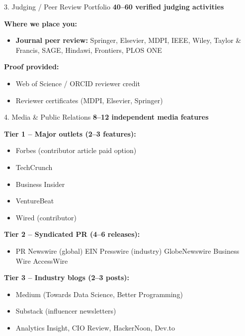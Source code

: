 \documentclass[aspectratio=169, 10pt]{beamer}
\begin{document}
	\begin{frame}{3. Judging / Peer Review Portfolio}
		\faGavel \hspace{0.2cm} \textbf{40–60 verified judging activities}
		
		\textbf{Where we place you:}
		\begin{itemize}
			\item \textbf{Journal peer review:} Springer, Elsevier, MDPI, IEEE, Wiley, Taylor \& Francis, SAGE, Hindawi, Frontiers, PLOS ONE
		\end{itemize}
		
		\textbf{Proof provided:}
		\begin{itemize}
			\item Web of Science / ORCID reviewer credit
			\item Reviewer certificates (MDPI, Elsevier, Springer)
		\end{itemize}
	\end{frame}
	
	\begin{frame}{4. Media \& Public Relations}
		\faNewspaper \hspace{0.2cm} \textbf{8–12 independent media features}
		
		\textbf{Tier 1 – Major outlets (2–3 features):}
		\begin{itemize}
			\item Forbes (contributor article paid option)
			\item TechCrunch
			\item Business Insider
			\item VentureBeat
			\item Wired (contributor)
		\end{itemize}
		
		\textbf{Tier 2 – Syndicated PR (4–6 releases):}
		\begin{itemize}
			\item PR Newswire (global)
	EIN Presswire (industry)
		 GlobeNewswire
			 Business Wire
			AccessWire
		\end{itemize}
		
		\textbf{Tier 3 – Industry blogs (2–3 posts):}
		\begin{itemize}
			\item Medium (Towards Data Science, Better Programming)
			\item Substack (influencer newsletters)
			\item Analytics Insight, CIO Review, HackerNoon, Dev.to
		\end{itemize}
	\end{frame}
	
\end{document}
